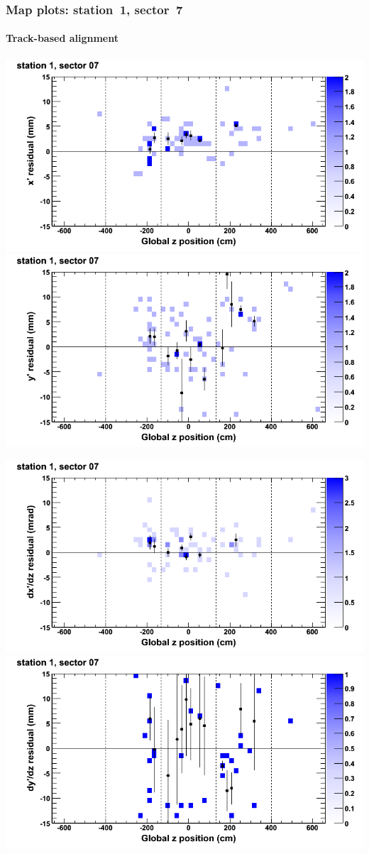 \documentclass[compress]{beamer}
\begin{document}
\begin{frame}
\frametitle{Map plots: station~1, sector~7}
\framesubtitle{Track-based alignment}
\includegraphics[width=0.5\linewidth]{mapplots_re05/DTvsz_st1sec07_x.png}
\includegraphics[width=0.5\linewidth]{mapplots_re05/DTvsz_st1sec07_y.png}

\includegraphics[width=0.5\linewidth]{mapplots_re05/DTvsz_st1sec07_dxdz.png}
\includegraphics[width=0.5\linewidth]{mapplots_re05/DTvsz_st1sec07_dydz.png}
\end{frame}
\end{document}
